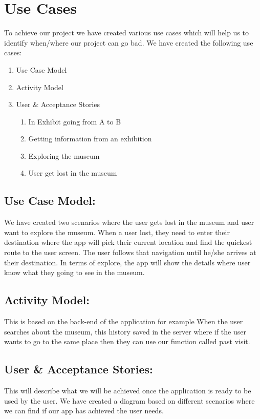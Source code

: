 \section{Use Cases}
To achieve our project we have created various use cases which will help us to identify when/where our project can go bad. We have created the following use cases:
\begin{enumerate}
    \item Use Case Model
    \item Activity Model
    \item User & Acceptance Stories
    \begin{enumerate}
        \item In Exhibit going from A to B
        \item Getting information from an exhibition
        \item Exploring the museum
        \item User get lost in the museum
    \end{enumerate}
\end{enumerate}

\subsection{Use Case Model:}
We have created two scenarios where the user gets lost in the museum and user want to explore the museum. When a user lost, they need to enter their destination where the app will pick their current location and find the quickest route to the user screen. The user follows that navigation until he/she arrives at their destination. In terms of explore, the app will show the details where user know what they going to see in the museum.

\subsection{Activity Model:}
This is based on the back-end of the application for example When the user searches about the museum, this history saved in the server where if the user wants to go to the same place then they can use our function called past visit.

\subsection{User & Acceptance Stories:}
This will describe what we will be achieved once the application is ready to be used by the user. We have created a diagram based on different scenarios where we can find if our app has achieved the user needs. 

